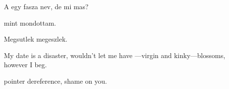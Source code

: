 A \Menugene egy fasza nev, de mi mas?

\Ibid mint mondottam.

Megsutlek \AndOr megeszlek.

My date is a disaster, \HeShe wouldn't let me have
\HisHer---virgin and kinky---blossoms, however I beg.

\NULL pointer dereference, shame on you.
